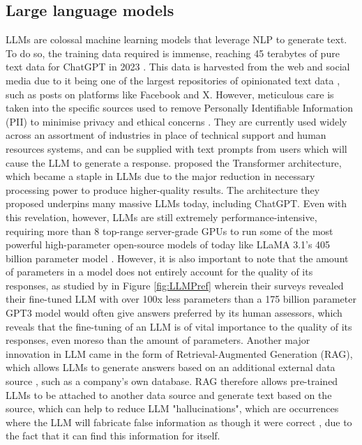 \documentclass[12pt]{report}
\begin{document}
    \subsection{Large language models}
    LLMs are colossal machine learning models that leverage NLP to generate text. To do so, the training data required is immense, 
    reaching 45 terabytes of pure text data for ChatGPT in 2023 \autocite{dwivedi_so_2023}. This data is harvested from the web \autocite{dubey_llama_2024}
    and social media due to it being one of the largest repositories of opinionated text data \autocite{wang_fine-grained_2016}, 
    such as posts on platforms like Facebook and X. However, meticulous care is taken into the specific sources used to remove 
    Personally Identifiable Information (PII) to minimise privacy and ethical concerns \autocite{dubey_llama_2024}. They are currently used widely across 
    an assortment of industries in place of technical support and human resources systems, and can be supplied with text 
    prompts from users which will cause the LLM to generate a response. \textcite{vaswani_attention_2017} proposed the 
    Transformer architecture, which became a staple in LLMs due to the major reduction in necessary processing power to produce higher-quality 
    results. The architecture they proposed underpins many massive LLMs today, including ChatGPT. Even with this revelation, however, LLMs are still extremely performance-intensive,
    requiring more than 8 top-range server-grade GPUs to run some of the most powerful high-parameter open-source models of today like LLaMA 3.1's 405 billion parameter model \autocite{dubey_llama_2024}.
    However, it is also important to note that the amount of parameters in a model does not entirely account for the quality of its responses, as studied by \textcite{ouyang_training_2022}
    in Figure \ref{fig:LLMPref} wherein their surveys revealed their fine-tuned LLM with over 100x less parameters than a 175 billion parameter 
    GPT3 model would often give answers preferred by its human assessors, which reveals that the fine-tuning of an LLM is of vital importance 
    to the quality of its responses, even moreso than the amount of parameters. Another major innovation in LLM came in the form of Retrieval-Augmented 
    Generation (RAG), which allows LLMs to generate answers based on an additional external data source \autocite{lewis_retrieval-augmented_2021}, such as a company's own database.
    RAG therefore allows pre-trained LLMs to be attached to another data source and generate text based on the source, which can help to reduce 
    LLM "hallucinations", which are occurrences where the LLM will fabricate false information as though it were correct \autocite{lewis_retrieval-augmented_2021}, 
    due to the fact that it can find this information for itself.
\end{document}
